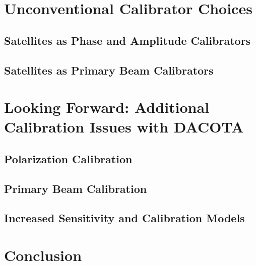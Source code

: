 \documentclass[preprint]{aastex}
\begin{document}
\section{Unconventional Calibrator Choices}\label{secsats}
\subsection{Satellites as Phase and Amplitude Calibrators}\label{ssecphampsat}
\subsection{Satellites as Primary Beam Calibrators}\label{ssecpbcalsat}
\section{Looking Forward: Additional Calibration Issues with DACOTA}\label{secfuture}
\subsection{Polarization Calibration}\label{ssecpolcal}
\subsection{Primary Beam Calibration}\label{ssecpbcal}
\subsection{Increased Sensitivity and Calibration Models}\label{ssecmodels}
\section{Conclusion}\label{secconc}



\end{document}
